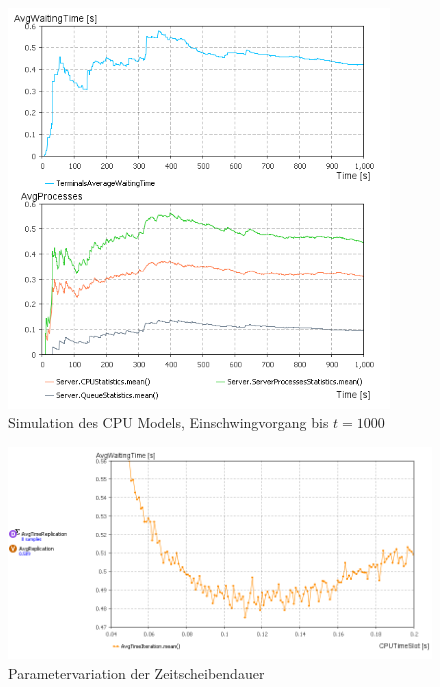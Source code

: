 \documentclass[
a4paper,   
headsepline, 
fleqn,     
11pt
]{scrartcl}
\begin{document}
\begin{figure}[h]
  \centering
  \includegraphics[width=0.9\textwidth]{./images/Simulation_t1000}
  \caption{Simulation des CPU Models, Einschwingvorgang bis $t=1000$}
  \label{fig:Simulation_t1000}
\end{figure}

\begin{figure}[h]
  \centering
  \includegraphics[width=1\textwidth]{./images/ParameterVariationCPUTimeSlot}
  \caption{Parametervariation der Zeitscheibendauer}
  \label{fig:ParametervariationB}
\end{figure}
\end{document}

